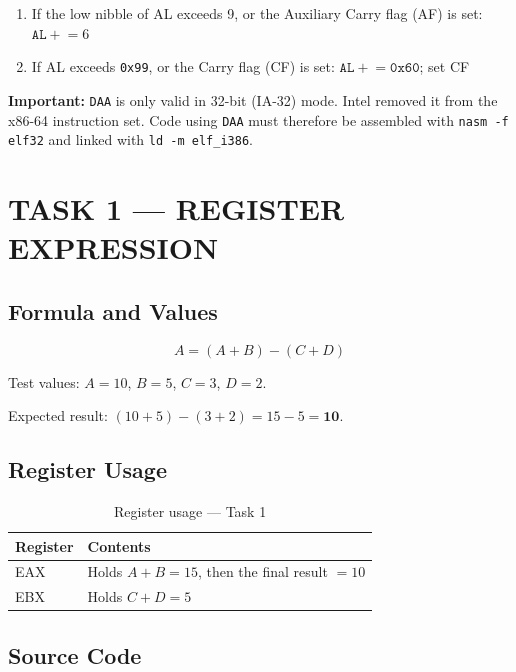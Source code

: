 \documentclass[12pt,a4paper]{article}
\begin{document}
\begin{enumerate}
    \item If the low nibble of AL exceeds 9, or the Auxiliary Carry flag (AF) is set:
    $\texttt{AL} \mathrel{+}= 6$
    \item If AL exceeds \texttt{0x99}, or the Carry flag (CF) is set:
    $\texttt{AL} \mathrel{+}= \texttt{0x60}$; set CF
\end{enumerate}

\noindent\textbf{Important:} \texttt{DAA} is only valid in 32-bit (IA-32) mode.  Intel
removed it from the x86-64 instruction set.  Code using \texttt{DAA} must therefore be
assembled with \texttt{nasm -f elf32} and linked with \texttt{ld -m elf\_i386}.

\newpage
\section{TASK 1 --- REGISTER EXPRESSION}

\subsection{Formula and Values}

\[
A = (A + B) - (C + D)
\]

Test values: $A = 10$, $B = 5$, $C = 3$, $D = 2$.

Expected result: $(10 + 5) - (3 + 2) = 15 - 5 = \mathbf{10}$.

\subsection{Register Usage}

\begin{table}[H]
\centering
\caption{Register usage --- Task 1}
\begin{tabular}{|l|l|}
\hline
\textbf{Register} & \textbf{Contents} \\
\hline
EAX & Holds $A+B = 15$, then the final result $= 10$ \\
\hline
EBX & Holds $C+D = 5$ \\
\hline
\end{tabular}
\end{table}

\subsection{Source Code}
\end{document}
